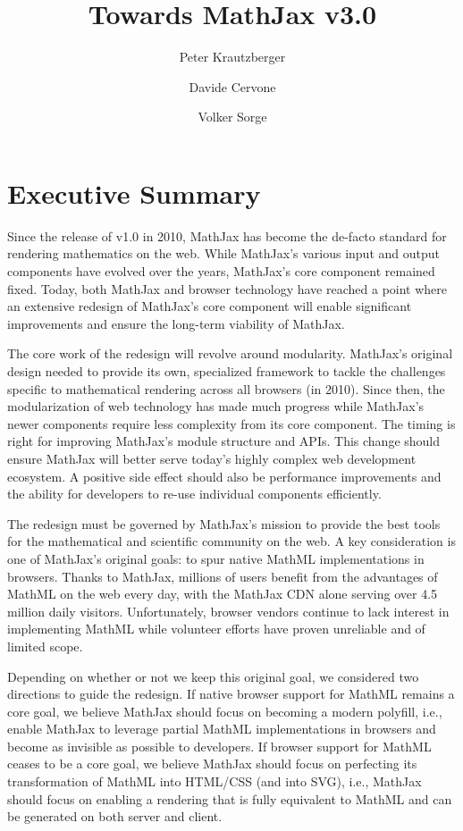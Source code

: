 \documentclass[]{amsart}
\title{Towards MathJax v3.0}
\author{Peter Krautzberger \and Davide Cervone \and Volker Sorge}
\date{}
\begin{document}
\maketitle

\section{Executive Summary}\label{executive-summary}

Since the release of v1.0 in 2010, MathJax has become the de-facto
standard for rendering mathematics on the web. While MathJax's various
input and output components have evolved over the years, MathJax's core
component remained fixed. Today, both MathJax and browser technology
have reached a point where an extensive redesign of MathJax's core
component will enable significant improvements and ensure the long-term
viability of MathJax.

The core work of the redesign will revolve around modularity. MathJax's
original design needed to provide its own, specialized framework to
tackle the challenges specific to mathematical rendering across all
browsers (in 2010). Since then, the modularization of web technology has
made much progress while MathJax's newer components require less
complexity from its core component. The timing is right for improving
MathJax's module structure and APIs. This change should ensure MathJax
will better serve today's highly complex web development ecosystem. A
positive side effect should also be performance improvements and the
ability for developers to re-use individual components efficiently.

The redesign must be governed by MathJax's mission to provide the best
tools for the mathematical and scientific community on the web. A key
consideration is one of MathJax's original goals: to spur native MathML
implementations in browsers. Thanks to MathJax, millions of users
benefit from the advantages of MathML on the web every day, with the
MathJax CDN alone serving over 4.5 million daily visitors.
Unfortunately, browser vendors continue to lack interest in implementing
MathML while volunteer efforts have proven unreliable and of limited
scope.

Depending on whether or not we keep this original goal, we considered
two directions to guide the redesign. If native browser support for
MathML remains a core goal, we believe MathJax should focus on becoming
a modern polyfill, i.e., enable MathJax to leverage partial MathML
implementations in browsers and become as invisible as possible to
developers. If browser support for MathML ceases to be a core goal, we
believe MathJax should focus on perfecting its transformation of MathML
into HTML/CSS (and into SVG), i.e., MathJax should focus on enabling a
rendering that is fully equivalent to MathML and can be generated on
both server and client.
\end{document}
